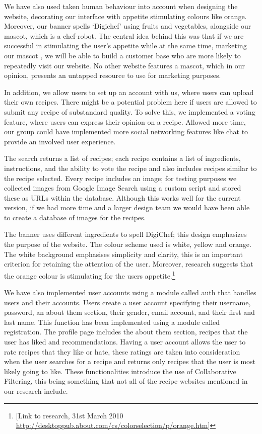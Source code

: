 We have also used taken human behaviour into account when designing the website, decorating our interface with appetite stimulating colours like orange. Moreover, our banner spells `Digichef' using fruits and vegetables, alongside our mascot, which is a chef-robot. The central idea behind this was that if we are successful in stimulating the user's appetite while at the same time, marketing our mascot , we will be able to build a customer base who are more likely to repeatedly visit our website. No other website features a mascot, which in our opinion, presents an untapped resource to use for marketing purposes. 

 In addition, we allow users to set up an account with us, where users can upload their own recipes. There might be a potential problem here if users are allowed to submit any recipe of substandard quality. To solve this, we implemented a voting feature, where users can express their opinion on a recipe. Allowed more time, our group could have implemented more social networking features like chat to provide an involved user experience.

The search returns a list of recipes; each recipe contains a list of ingredients, instructions, and the ability to vote the recipe and also includes recipes similar to the recipe selected. Every recipe includes an image; for testing purposes we collected images from Google Image Search using a custom script and stored these as URLs within the database. Although this works well for the current version, if we had more time and a larger design team we would have been able to create a database of images for the recipes. 

The banner uses different ingredients to spell DigiChef; this design emphasizes the purpose of the website. The colour scheme used is white, yellow and orange. The white background emphasises simplicity and clarity, this is an important criterion for retaining the attention of the user.  Moreover, research suggests that the orange colour is stimulating for the users appetite.\footnote{[Link to research, 31st March 2010 \url{http://desktoppub.about.com/cs/colorselection/p/orange.htm}]} 


We have also implemented user accounts using a module called auth that handles users and their accounts. Users create a user account specifying their username, password, an about them section, their gender, email account, and their first and last name. This function has been implemented using a module called registration. The profile page includes the about them section, recipes that the user has liked and recommendations. Having a user account allows the user to rate recipes that they like or hate, these ratings are taken into consideration when the user searches for a recipe and returns only recipes that the user is most likely going to like. These functionalities introduce the use of Collaborative Filtering, this being something that not all of the recipe websites mentioned in our research include. 
